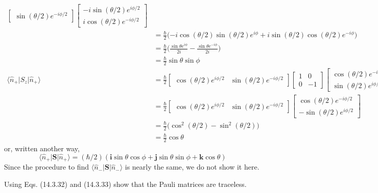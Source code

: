 \documentclass[../principles-of-quantum-mechanics.tex]{subfiles}
\begin{document}
\begin{questions}
\begin{solution}
\begin{align*}
\begin{bmatrix}
					\sin(\theta/2)e^{-i\phi/2}
				\end{bmatrix}\begin{bmatrix}
					-i\sin(\theta/2)e^{i\phi/2} \\
					i\cos(\theta/2)e^{-i\phi/2}
				\end{bmatrix} \\
				&= \frac{\hbar}{2}\Big({-i\cos}(\theta/2)\sin(\theta/2)e^{i\phi} + i\sin(\theta/2)\cos(\theta/2)e^{-i\phi}\Big) \\
				&= \frac{\hbar}{2}\Big(\frac{\sin\theta e^{i\phi}}{2i} - \frac{\sin\theta e^{-i\phi}}{2i}\Big) \\
				&= \frac{\hbar}{2}\sin\theta\sin\phi \\
				\langle \hat{n}_+|S_z|\hat{n}_+\rangle &= \frac{\hbar}{2}\begin{bmatrix}
					\cos(\theta/2)e^{i\phi/2} &
					\sin(\theta/2)e^{-i\phi/2}
				\end{bmatrix}\begin{bmatrix}
					1 & 0 \\ 0 & -1
				\end{bmatrix}\begin{bmatrix}
					\cos(\theta/2)e^{-i\phi/2} \\
					\sin(\theta/2)e^{i\phi/2}
				\end{bmatrix} \\
				&= \frac{\hbar}{2}\begin{bmatrix}
					\cos(\theta/2)e^{i\phi/2} &
					\sin(\theta/2)e^{-i\phi/2}
				\end{bmatrix}\begin{bmatrix}
					\cos(\theta/2)e^{-i\phi/2} \\
					-\sin(\theta/2)e^{i\phi/2}
				\end{bmatrix} \\
				&= \frac{\hbar}{2}\Big(\cos^2(\theta/2) - \sin^2(\theta/2)\Big) \\
				&= \frac{\hbar}{2}\cos\theta
			\end{align*}
			or, written another way,
			$$\langle \hat{n}_+|\mathbf{S}|\hat{n}_+\rangle = (\hbar/2)(\mathbf{i}\sin\theta\cos\phi + \mathbf{j}\sin\theta\sin\phi + \mathbf{k}\cos\theta)$$
			Since the procedure to find $\langle \hat{n}_-|\mathbf{S}|\hat{n}_-\rangle$ is nearly the same, we do not show it here.
		\end{solution}
		
		\question Using Eqs. (14.3.32) and (14.3.33) show that the Pauli matrices are traceless.
		

\end{questions}
\end{document}
